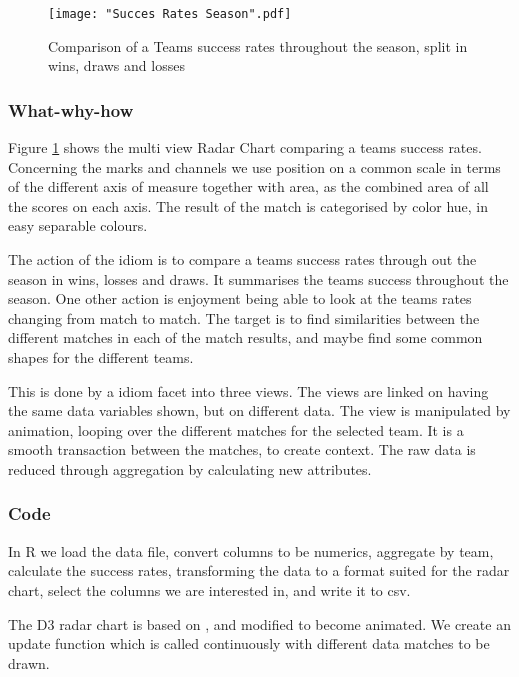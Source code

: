 \documentclass[Report.tex]{subfiles}
\begin{document}
\begin{figure}
\center
\texttt{[image: "Succes Rates Season".pdf]}
\caption{Comparison of a Teams success rates throughout the season, split in wins, draws and losses}
\label{Fig:CC}
\end{figure}


\subsubsection{What-why-how}
Figure \ref{Fig:CC} shows the multi view Radar Chart comparing a teams success rates. Concerning the marks and channels we use position on a common scale in terms of the different axis of measure together with area, as the combined area of all the scores on each axis. The result of the match is categorised by color hue, in easy separable colours.  

The action of the idiom is to compare a teams success rates through out the season in wins, losses and draws. It summarises the teams success throughout the season. One other action is enjoyment being able to look at the teams rates changing from match to match.
The target is to find similarities between the different matches in each of the match results, and maybe find some common shapes for the different teams.

This is done by a idiom facet into three views. The views are linked on having the same data variables shown, but on different data. The view is manipulated by animation, looping over the different matches for the selected team. It is a smooth transaction between the matches, to create context. The raw data is reduced through aggregation by calculating new attributes.

\subsubsection{Code}
In R we load the data file, convert columns to be numerics, aggregate by team, calculate the success rates, transforming the data to a format suited for the radar chart, select the columns we are interested in, and write it to csv.

The D3 radar chart is based on \cite{Radar}, and modified to become animated. We create an update function which is called continuously with different data matches to be drawn. 
\end{document}
